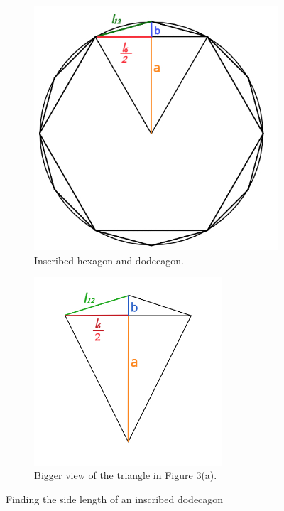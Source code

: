 \documentclass{article}
\begin{document}
\begin{figure}[ht]
     \centering
     \begin{subfigure}[b]{0.4\textwidth}
         \centering
         \includegraphics[width=\textwidth]{figure4.jpeg}
         \caption{Inscribed hexagon and dodecagon.}
     \end{subfigure}
     \hfill
     \begin{subfigure}[b]{0.5\textwidth}
         \centering
         \includegraphics[width=7cm]{figure5.jpeg}
         \caption{Bigger view of the triangle in Figure 3(a).}
     \end{subfigure}
     \caption{Finding the side length of an inscribed dodecagon}
     \label{fig:3}
\end{figure}
\end{document}
